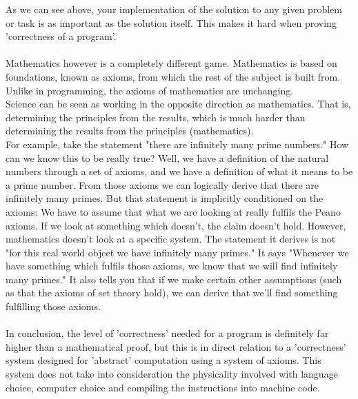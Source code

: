 \documentclass[a4paper,12pt]{article}
\begin{document}
As we can see above, your implementation of the solution to any given problem or task is as important as the solution itself. This makes it hard when proving 'correctness of a program'. \\
\\
Mathematics however is a completely different game. Mathematics is based on foundations, known as axioms, from which the rest of the subject is built from.  Unlike in programming, the axioms of mathematics are unchanging. \\
Science can be seen as working in the opposite direction as mathematics. That is, determining the principles from the results, which is much harder than determining the results from the principles (mathematics).\\
For example, take the statement "there are infinitely many prime numbers." How can we know this to be really true? Well, we have a definition of the natural numbers through a set of axioms, and we have a definition of what it means to be a prime number. From those axioms we can logically derive that there are infinitely many primes. But that statement is implicitly conditioned on the axioms: We have to assume that what we are looking at really fulfils the Peano axioms. If we look at something which doesn't, the claim doesn't hold. However, mathematics doesn't look at a specific system. The statement it derives is not "for this real world object we have infinitely many primes." It says "Whenever we have something which fulfils those axioms, we know that we will find infinitely many primes." It also tells you that if we make certain other assumptions (such as that the axioms of set theory hold), we can derive that we'll find something fulfilling those axioms.\\
\\
In conclusion, the level of 'correctness' needed for a program is definitely far higher than a mathematical proof, but this is in direct relation to a 'correctness' system designed for 'abstract' computation using a system of axioms. This system does not take into consideration the physicality involved with language choice, computer choice and compiling the instructions into machine code.  
 
\end{document}
